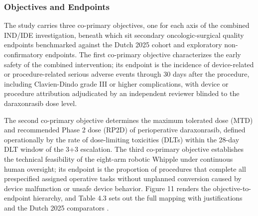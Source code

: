 \subsubsection{Objectives and Endpoints}

The study carries three co-primary objectives, one for each axis of the combined
IND/IDE investigation, beneath which sit secondary oncologic-surgical quality
endpoints benchmarked against the Dutch 2025 cohort and exploratory non-confirmatory
endpoints. The first co-primary objective characterizes the early safety of the
combined intervention; its endpoint is the incidence of device-related or
procedure-related serious adverse events through 30 days after the procedure,
including Clavien-Dindo grade III or higher complications, with device or procedure
attribution adjudicated by an independent reviewer blinded to the daraxonrasib dose
level. 

The second co-primary objective determines the maximum tolerated dose (MTD)
and recommended Phase 2 dose (RP2D) of perioperative daraxonrasib, defined
operationally by the rate of dose-limiting toxicities (DLTs) within the 28-day DLT
window of the 3+3 escalation. The third co-primary objective establishes the
technical feasibility of the eight-arm robotic Whipple under continuous human
oversight; its endpoint is the proportion of procedures that complete all
prespecified assigned operative tasks without unplanned conversion caused by device
malfunction or unsafe device behavior. Figure 11 renders the objective-to-endpoint
hierarchy, and Table 4.3 sets out the full mapping with justifications and the Dutch
2025 comparators \cite{daraxwhipple,phase1guidance}.

